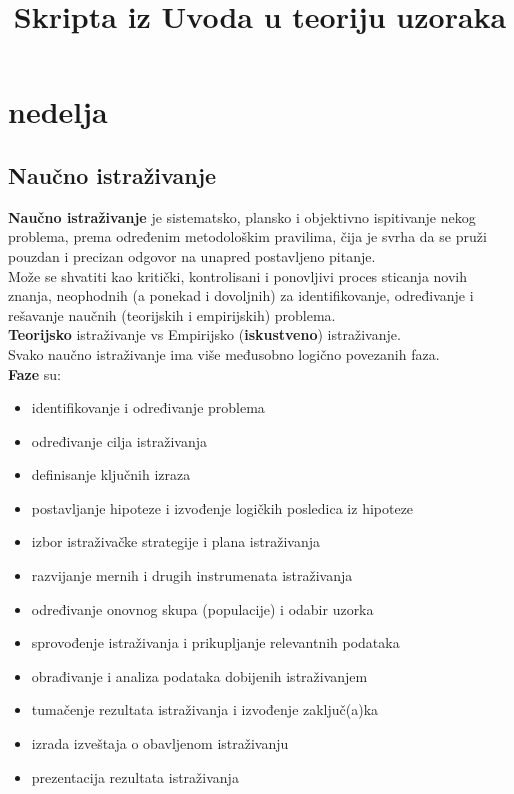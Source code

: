 \documentclass[10pt,a4paper,]{article}
\title{Skripta iz Uvoda u teoriju uzoraka}
\begin{document}
\maketitle

\section{nedelja}
\subsection{Naučno istraživanje}
\textbf{Naučno istraživanje} je sistematsko, plansko i objektivno ispitivanje nekog problema, prema određenim metodološkim pravilima, čija je svrha da se pruži pouzdan i precizan odgovor na unapred postavljeno pitanje.
\\[0.1cm]

Može se shvatiti kao kritički, kontrolisani i ponovljivi proces sticanja novih znanja, neophodnih (a ponekad i dovoljnih) za identifikovanje, određivanje i rešavanje naučnih (teorijskih i empirijskih) problema.
\\[0.1cm]

\textbf{Teorijsko} istraživanje vs Empirijsko (\textbf{iskustveno})
istraživanje.
\\[0.3cm]

Svako naučno istraživanje ima više međusobno logično povezanih faza. 
\\
\textbf{Faze} su:
\begin{itemize}
	\item identifikovanje i određivanje problema

	\item određivanje cilja istraživanja
	\item definisanje ključnih izraza
	\item postavljanje hipoteze i izvođenje logičkih posledica iz hipoteze
	\item izbor istraživačke strategije i plana istraživanja
	\item razvijanje mernih i drugih instrumenata istraživanja
	\item određivanje onovnog skupa (populacije) i odabir uzorka
	\item sprovođenje istraživanja i prikupljanje relevantnih podataka
	\item obrađivanje i analiza podataka dobijenih istraživanjem
	\item tumačenje rezultata istraživanja i izvođenje zaključ(a)ka
	\item izrada izveštaja o obavljenom istraživanju
	\item prezentacija rezultata istraživanja


\end{itemize}
\end{document}
